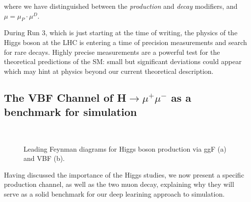 where we have distinguished between the \emph{production} and \emph{decay} modifiers, and $\mu = \mu_P \cdot \mu^D$.

During Run 3, which is just starting at the time of writing, the
physics of the Higgs boson at the LHC is entering a time of precision measurements and
search for rare decays. Highly precise measurements are a powerful test for the theoretical predictions of the SM: small but significant deviations could appear which may hint at physics beyond our current theoretical description.

\subsection{The VBF Channel of H$\rightarrow\mu^+\mu^-$ as a benchmark for simulation}

\begin{figure}
    \myfloatalign
     \quad
     \\
    \caption[ggF and VBF]{Leading Feynman diagrams for Higgs boson production via ggF (a) and VBF (b).}\label{fig:feypro}
\end{figure}
Having discussed the importance of the Higgs studies, we now present a specific production channel, as well as the two muon decay, explaining why they will serve as a solid benchmark for our deep learining approach to simulation.

